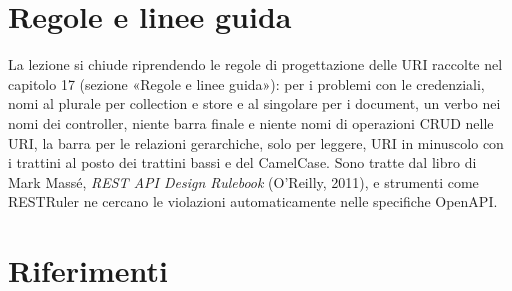 \section{Regole e linee guida}

La lezione si chiude riprendendo le regole di progettazione delle URI raccolte
nel capitolo 17 (sezione «Regole e linee guida»):  per i problemi con
le credenziali, nomi al plurale per collection e store e al singolare per i
document, un verbo nei nomi dei controller, niente barra finale e niente nomi
di operazioni CRUD nelle URI, la barra per le relazioni gerarchiche,
 solo per leggere, URI in minuscolo con i trattini al posto dei
trattini bassi e del CamelCase. Sono tratte dal libro di Mark Massé, \textit{REST
API Design Rulebook} (O'Reilly, 2011), e strumenti come RESTRuler ne cercano le
violazioni automaticamente nelle specifiche OpenAPI.

\section{Riferimenti}

